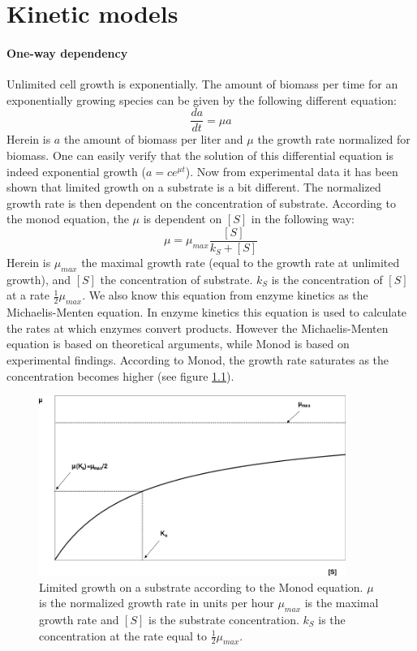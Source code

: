 \documentclass[10pt]{report}
\begin{document}
\chapter{Kinetic models}

\subsubsection{One-way dependency} \label{sec:un}
Unlimited cell growth is exponentially. The amount of biomass per time for an exponentially growing species can be given by the following different equation:
\begin{equation}
 \frac{da}{dt} = \mu a
\end{equation}
Herein is $a$ the amount of biomass per liter and $\mu$ the growth rate normalized for biomass. One can easily verify that the solution of this differential equation is indeed exponential growth ($a = ce^{\mu t}$). Now from experimental data it has been shown that limited growth on a substrate is a bit different. The normalized growth rate is then dependent on the concentration of substrate. According to the monod equation, the $\mu$ is dependent on $[S]$ in the following way:
\begin{equation}
 \mu = \mu_{max} \frac{[S]}{k_{S}+[S]}
\end{equation}
Herein is $\mu_{max}$ the maximal growth rate (equal to the growth rate at unlimited growth), and $[S]$ the concentration of substrate. $k_S$ is the concentration of $[S]$ at a rate $\frac{1}{2}\mu_{max}$. We also know this equation from enzyme kinetics as the Michaelis-Menten equation. In enzyme kinetics this equation is used to calculate the rates at which enzymes convert products. However the Michaelis-Menten equation is based on theoretical arguments, while Monod is based on experimental findings.
According to Monod, the growth rate saturates as the concentration becomes higher (see figure \ref{fig:monod}).

\begin{figure}[!ht]
 \begin{center}  
     \includegraphics[width=10cm]{Monod_3.png}
     \caption{Limited growth on a substrate according to the Monod equation. $\mu$ is the normalized growth rate in units per hour $\mu_{max}$ is the maximal growth rate and $[S]$ is the substrate concentration. $k_S$ is the concentration at the rate equal to 
     $\frac{1}{2} \mu_{max}$.}
    \label{fig:monod}
    \end{center}
\end{figure}
\end{document}

